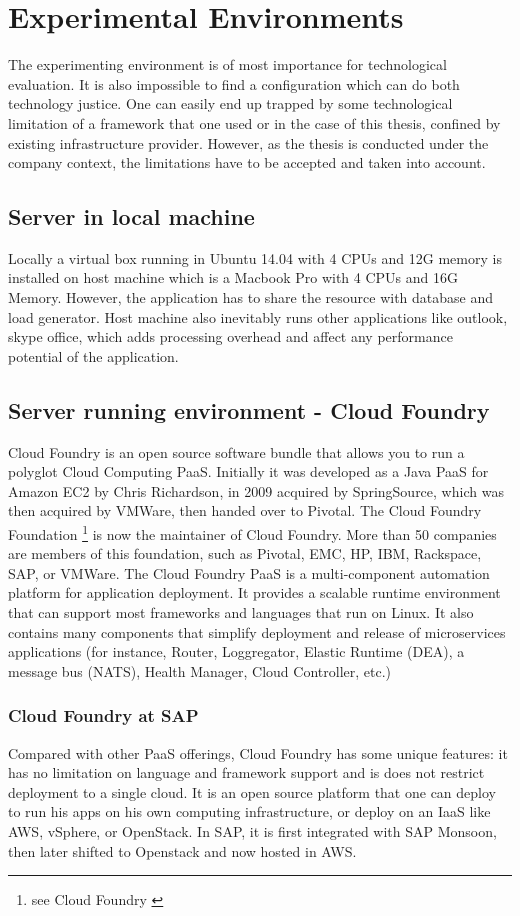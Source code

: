 \chapter{Experimental Environments}

The experimenting environment is of most importance for technological evaluation. It is also impossible to find a configuration which can do both technology justice. One can easily end up trapped by some technological limitation of a framework that one used or in the case of this thesis, confined by existing infrastructure provider. However, as the thesis is conducted under the company context, the limitations have to be accepted and taken into account. 

\section{Server in local machine}
Locally a virtual box running in Ubuntu 14.04 with 4 CPUs and 12G memory is installed on host machine which is a Macbook  Pro with 4 CPUs and 16G Memory. However, the application has to share the resource with database and load generator. Host machine also inevitably runs other applications like outlook, skype office, which adds processing overhead and affect any performance potential of the application. 

\section{Server running environment -  Cloud Foundry}
Cloud Foundry is an open source software bundle that allows you to run a polyglot Cloud Computing \ac{PaaS}. Initially it was developed as a Java \ac{PaaS} for Amazon EC2 by Chris Richardson, in 2009 acquired by SpringSource, which was then acquired by VMWare, then handed over to Pivotal.
The Cloud Foundry Foundation \footnote{see Cloud Foundry \citep{Pivotal} } is now the maintainer of Cloud Foundry. More than 50 companies are members of this foundation, such as Pivotal, EMC, HP, IBM, Rackspace, SAP, or VMWare.
The Cloud Foundry PaaS is a multi-component automation platform for application deployment. It provides a scalable runtime environment that can support most frameworks and languages that run on Linux. It also contains many components that simplify deployment and release of microservices applications (for instance, Router, Loggregator, Elastic Runtime (\ac{DEA}), a message bus (NATS), Health Manager, Cloud Controller, etc.)

\subsection{Cloud Foundry at SAP}
Compared with other PaaS offerings, Cloud Foundry has some unique features: it has no limitation on language and framework support and is does not restrict deployment to a single cloud.  It is an open source platform that one can deploy to run his apps on his own computing infrastructure, or deploy on an IaaS like \ac{AWS}, vSphere, or OpenStack. In SAP, it is first integrated with SAP Monsoon, then later shifted to Openstack and now hosted in \ac{AWS}. 

